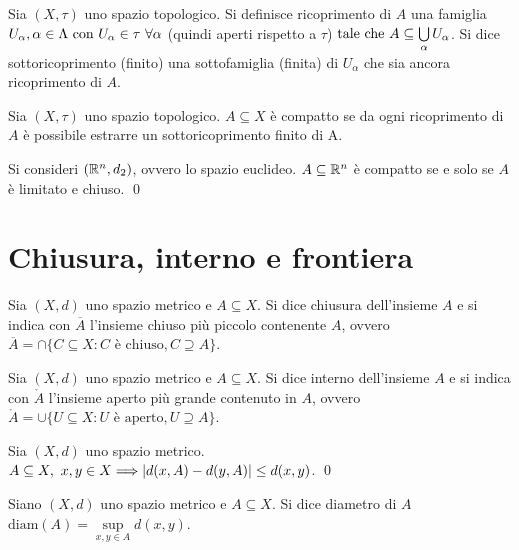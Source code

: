 \begin{definition}
    [Ricoprimento]
    Sia $(X, \tau)$ uno spazio topologico. Si definisce ricoprimento di $A$ una famiglia $U_\alpha, \alpha \in \Lambda \text{ con } U_\alpha \in \tau \ \forall \alpha$ (quindi aperti rispetto a $\tau$)$\text{ tale che } A \subseteq \bigcup\limits_\alpha U_\alpha$. Si dice sottoricoprimento (finito) una sottofamiglia (finita) di $U_\alpha$ che sia ancora ricoprimento di $A$.
\end{definition}

\begin{definition}
    Sia $(X, \tau)$ uno spazio topologico. $A \subseteq X$ è compatto se da ogni ricoprimento di $A$ è possibile estrarre un sottoricoprimento finito di A.
\end{definition}

\begin{theorem}
    Si consideri $(\mathbb{R}^n, d_2)$, ovvero lo spazio euclideo. $A \subseteq \mathbb{R}^n$ è compatto se e solo se $A$ è limitato e chiuso. \qed
\end{theorem}

\section{Chiusura, interno e frontiera}

\begin{definition}
    Sia $(X, d)$ uno spazio metrico e $A \subseteq X$. Si dice chiusura dell'insieme $A$ e si indica con $\overline{A}$ l'insieme chiuso più piccolo contenente $A$, ovvero $\overline{A} = \cap\{C\subseteq X : C \text{ è chiuso}, C \supseteq A\}$.
\end{definition}

\begin{definition}
    Sia $(X, d)$ uno spazio metrico e $A \subseteq X$. Si dice interno dell'insieme $A$ e si indica con $\mathring{A}$ l'insieme aperto più grande contenuto in $A$, ovvero $\mathring{A} = \cup\{U\subseteq X: U \text{ è aperto}, U \supseteq A\}$.
\end{definition}

\begin{prop}
    Sia $(X, d)$ uno spazio metrico. $A \subseteq X, \ x,y \in X \Longrightarrow \abs{d(x,A)-d(y,A)}\leq d(x,y)$. \qed
\end{prop}

\begin{definition}
    [Diametro]
    Siano $(X,d)$ uno spazio metrico e $A \subseteq X$. Si dice diametro di $A$ $\text{diam}(A)=\sup\limits_{x,y \in A}d(x,y)$.
\end{definition}

